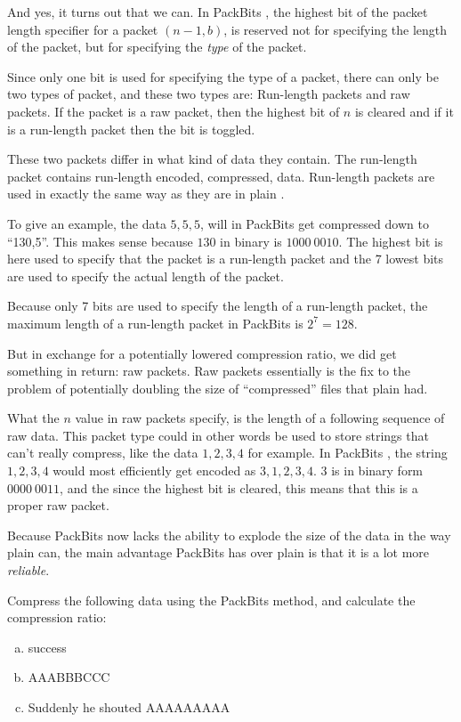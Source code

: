 And yes, it turns out that we can. In PackBits \rle, the highest bit of
the packet length specifier for a packet $(n-1,b)$, is reserved not
for specifying the length of the packet, but for specifying the
\textit{type} of the packet.

Since only one bit is used for specifying the type of a packet, there
can only be two types of packet, and these two types are: Run-length
packets and raw packets. If the packet is a raw packet, then the
highest bit of $n$ is cleared and if it is a run-length packet then
the bit is toggled.

These two packets differ in what kind of data they contain. The
run-length packet contains run-length encoded, compressed,
data. Run-length packets are used in exactly the same way as they are
in plain \rle.

To give an example, the data $5,5,5$, will in PackBits \rle get
compressed down to ``130,5''. This makes sense because $130$ in binary
is $1000\ 0010$. The highest bit is here used to specify that the
packet is a run-length packet and the 7 lowest bits are used to
specify the actual length of the packet.

Because only 7 bits are used to specify the length of a run-length
packet, the maximum length of a run-length packet in PackBits \rle is
$2^7 = 128$.

But in exchange for a potentially lowered compression ratio, we did
get something in return: raw packets. Raw packets essentially is the
fix to the problem of potentially doubling the size of ``compressed''
files that plain \rle had.

What the $n$ value in raw packets specify, is the length of a
following sequence of raw data. This packet type could in other words
be used to store strings that \rle can't really compress, like the data
$1,2,3,4$ for example. In PackBits \rle, the string $1,2,3,4$ would
most efficiently get encoded as $3,1,2,3,4$. $3$ is in binary form
$0000\ 0011$, and the since the highest bit is cleared, this means
that this is a proper raw packet.

Because PackBits \rle now lacks the ability to explode the size of the
data in the way plain \rle can, the main advantage PackBits \rle has
over plain \rle is that it is a lot more \textit{reliable}.

\begin{Exercise}[label={packbits-rle}]

  Compress the following data using the PackBits \rle method, and
  calculate the compression ratio:

  \begin{enumerate}[(a)]
  \item success
  \item AAABBBCCC
  \item Suddenly he shouted AAAAAAAAA
  \end{enumerate}

\end{Exercise}

